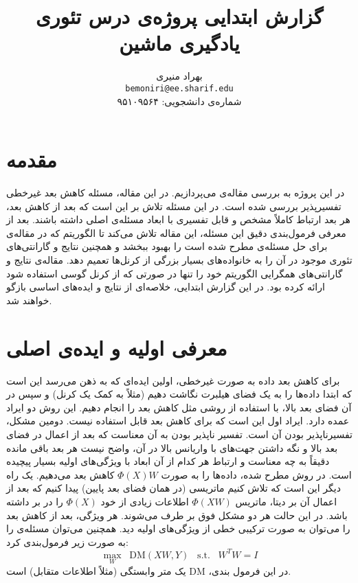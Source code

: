 \documentclass[a4paper]{article}
\title{گزارش ابتدایی پروژه‌ی درس تئوری یادگیری ماشین}
\author{
	بهراد منیری\\
	\texttt{bemoniri@ee.sharif.edu}\\
	\normalsize{شماره‌ی دانشجویی: ۹۵۱۰۹۵۶۴}
}
\date{}
\begin{document}
	\maketitle
	\section{مقدمه}
	در این پروژه به بررسی مقاله‌ی 
	\cite{main}
	می‌پردازیم. در این مقاله، مسئله کاهش بعد غیرخطی  تفسیر‌پذیر 
	بررسی شده است.  در این مسئله تلاش بر این است که بعد از کاهش‌ بعد، هر بعد ارتباط کاملاً مشخص و قابل تفسیری با ابعاد مسئله‌ی اصلی داشته باشند. بعد از معرفی فرمول‌بندی دقیق این مسئله، این مقاله تلاش می‌کند تا الگوریتم
	که در مقاله‌ی 
	\cite{ISM}
	برای حل مسئله‌ی
	مطرح شده است را بهبود ببخشد و همچنین نتایج و گارانتی‌های تئوری موجود در آن را به خانواده‌های بسیار بزرگی از کرنل‌ها تعمیم دهد. مقاله‌ی \cite{ISM} نتایج و گارانتی‌های همگرایی الگوریتم  خود را تنها در صورتی که از کرنل گوسی استفاده شود ارائه کرده بود. در این گزارش ابتدایی، خلاصه‌ای از نتایج و ایده‌های اساسی بازگو خواهند شد.
	
	\section{معرفی اولیه و ایده‌ی اصلی}
	برای کاهش بعد داده به صورت غیر‌خطی، اولین ایده‌ای که به ذهن می‌رسد این است که ابتدا داده‌ها را به یک فضای هیلبرت نگاشت دهیم (مثلاً به کمک یک کرنل) و سپس در آن فضای بعد بالا، با استفاده از روشی مثل 
	کاهش بعد را انجام دهیم. این روش دو ایراد عمده دارد. ایراد اول این است که برای کاهش بعد 
	قابل استفاده نیست. دومین مشکل، تفسیر‌ناپذیر بودن آن است. تفسیر ناپذیر بودن به آن معناست که بعد از اعمال 
	در فضای بعد بالا و نگه داشتن جهت‌های با واریانس بالا در آن، واضح نیست هر بعد باقی مانده دقیقاً به چه معناست و ارتباط هر کدام از آن ابعاد با ویژگی‌های اولیه بسیار پیچیده است. در روش مطرح شده، داده‌ها را به صورت 
	$\Phi(X)W$
	کاهش بعد می‌دهیم. یک راه دیگر این است که تلاش کنیم ماتریسی (در همان فضای بعد پایین) پیدا کنیم که بعد از اعمال آن بر دیتا، ماتریس
	$\Phi(XW)$
	اطلاعات زیادی از خود 
	$\Phi(X)$
	را در بر داشته باشد. در این حالت هر دو مشکل فوق بر طرف می‌شوند. هر ویژگی، بعد از کاهش بعد را می‌توان به صورت ترکیبی خطی از ویژگی‌های اولیه دید. همچنین می‌توان مسئله‌ی 
	را به صورت زیر فرمول‌بندی کرد:
	$$\max_W\;\; \mathrm{DM} (XW, Y) \;\;\; \mathrm{s.t}. \;\;\; W^TW=I$$
	در این فرمول بندی، 
	$\mathrm{DM}$
	یک متر وابستگی (مثلاً اطلاعات متقابل) است.
	
\end{document}
